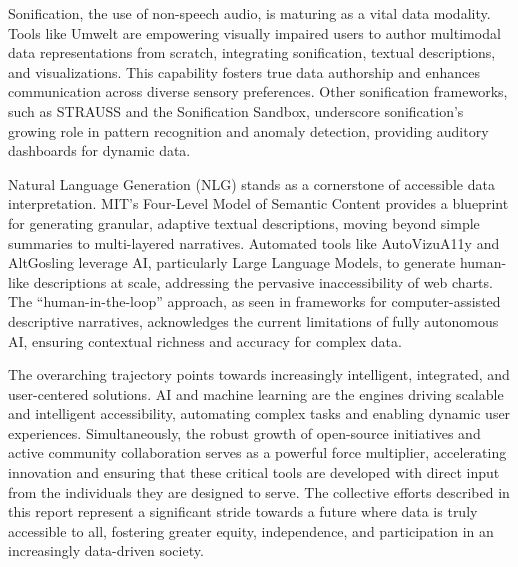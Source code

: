 Sonification, the use of non-speech audio, is maturing as a vital data modality. Tools like Umwelt are empowering visually impaired users to author multimodal data representations from scratch, integrating sonification, textual descriptions, and visualizations. This capability fosters true data authorship and enhances communication across diverse sensory preferences. Other sonification frameworks, such as STRAUSS and the Sonification Sandbox, underscore sonification's growing role in pattern recognition and anomaly detection, providing auditory dashboards for dynamic data.

Natural Language Generation (NLG) stands as a cornerstone of accessible data interpretation. MIT's Four-Level Model of Semantic Content provides a blueprint for generating granular, adaptive textual descriptions, moving beyond simple summaries to multi-layered narratives. Automated tools like AutoVizuA11y and AltGosling leverage AI, particularly Large Language Models, to generate human-like descriptions at scale, addressing the pervasive inaccessibility of web charts. The ``human-in-the-loop'' approach, as seen in frameworks for computer-assisted descriptive narratives, acknowledges the current limitations of fully autonomous AI, ensuring contextual richness and accuracy for complex data.

The overarching trajectory points towards increasingly intelligent, integrated, and user-centered solutions. AI and machine learning are the engines driving scalable and intelligent accessibility, automating complex tasks and enabling dynamic user experiences. Simultaneously, the robust growth of open-source initiatives and active community collaboration serves as a powerful force multiplier, accelerating innovation and ensuring that these critical tools are developed with direct input from the individuals they are designed to serve. The collective efforts described in this report represent a significant stride towards a future where data is truly accessible to all, fostering greater equity, independence, and participation in an increasingly data-driven society.
